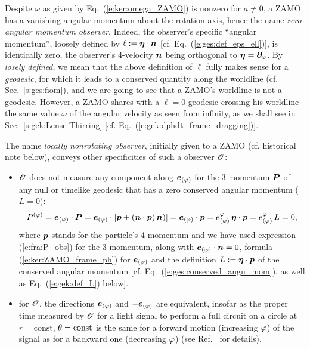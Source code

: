 Despite $\omega$ as given by Eq.~(\ref{e:ker:omega_ZAMO}) is nonzero for $a\neq 0$, a ZAMO has a vanishing angular momentum about the rotation axis,
hence the name \emph{zero-angular momentum observer}. Indeed, the observer's specific ``angular momentum'', loosely defined by $\ell := \bm{\eta}\cdot\bm{n}$ [cf. Eq.~(\ref{e:ges:def_eps_ell})], is identically
zero, the observer's 4-velocity $\bm{n}$ being orthogonal to $\bm{\eta} = \bm{\partial}_\varphi$. By \emph{losely
defined}, we mean that the above definition of $\ell$  fully makes sense for a \emph{geodesic},
for which it leads to
a conserved quantity along the worldline (cf. Sec.~\ref{s:ges:fiom}), and we are going to see
that a ZAMO's worldline is not a geodesic. However, a ZAMO shares with a $\ell=0$ geodesic
crossing his worldline the same value $\omega$ of the angular velocity as seen from infinity,
as we shall see in Sec.~\ref{s:gek:Lense-Thirring} [cf. Eq.~(\ref{e:gek:dphdt_frame_dragging})].


The name \emph{locally nonrotating observer}, initially given to a ZAMO (cf. historical note below),
conveys other specificities of such a observer $\mathscr{O}$:
\begin{itemize}
\item
$\mathscr{O}$ does not measure any component
along $\bm{e}_{(\varphi)}$ for the 3-momentum $\bm{P}$ of any null or timelike geodesic
that has a zero conserved angular momentum ($L=0$):
\[
    P^{(\varphi)} = \bm{e}_{(\varphi)}\cdot\bm{P} = \bm{e}_{(\varphi)}\cdot[\bm{p} + (\bm{n}\cdot\bm{p})\, \bm{n})] =
     \bm{e}_{(\varphi)}\cdot\bm{p} = e_{(\varphi)}^\varphi \, \bm{\eta}\cdot\bm{p} =  e_{(\varphi)}^\varphi \, L = 0 ,
\]
where $\bm{p}$ stands for the particle's 4-momentum and we have used expression
(\ref{e:fra:P_obs}) for the 3-momentum, along with $\bm{e}_{(\varphi)}\cdot\bm{n} = 0$,
formula (\ref{e:ker:ZAMO_frame_ph}) for $\bm{e}_{(\varphi)}$ and the
definition $L := \bm{\eta}\cdot\bm{p}$ of the conserved angular momentum
[cf. Eq.~(\ref{e:ges:conserved_angu_mom}), as well as Eq.~(\ref{e:gek:def_L}) below].
\item for $\mathscr{O}$, the directions $\bm{e}_{(\varphi)}$ and $-\bm{e}_{(\varphi)}$ are equivalent,
insofar as the proper time measured by $\mathscr{O}$ for a light signal to perform a full circuit on a circle
at $r=\mathrm{const}$, $\theta=\mathrm{const}$ is the same for a forward motion (increasing $\varphi$)
of the signal as for a backward one (decreasing $\varphi$)  (see Ref.~\cite{Barde70} for details).
\end{itemize}

